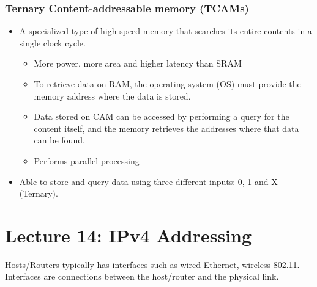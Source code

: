 \documentclass[a4paper]{article}
\begin{document}
\subsubsection{Ternary Content-addressable memory (TCAMs)}
\begin{itemize}
    \item A specialized type of high-speed memory that searches its entire contents in a single clock cycle. 
    \begin{itemize}[label=$\circ$]
        \item More power, more area and higher latency than SRAM
        \item To retrieve data on RAM, the operating system (OS) must provide the memory address where the data is stored. 
        \item Data stored on CAM can be accessed by performing a query for the content itself, and the memory retrieves the addresses where that data can be found.
        \item Performs parallel processing 
    \end{itemize}
    \item Able to store and query data using three different inputs: 0, 1 and X (Ternary).
\end{itemize}

\newpage
\section{Lecture 14: IPv4 Addressing}
Hosts/Routers typically has interfaces such as wired Ethernet, wireless 802.11. Interfaces are connections between the host/router and the physical link.

\medskip
\end{document}
